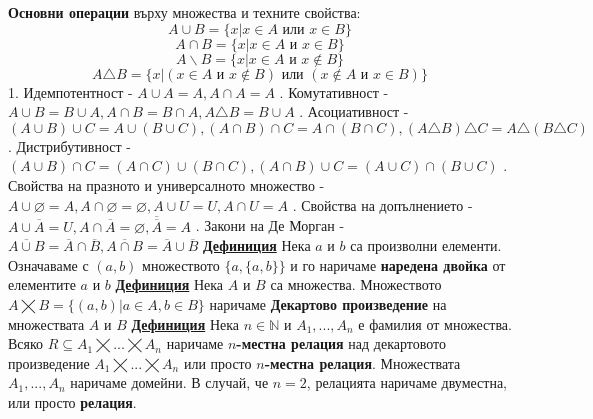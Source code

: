 \documentclass{article}
\begin{document}
\textbf{Основни операции} върху множества и техните свойства:
$$A \cup B = \{x | x \in A \text{ или } x \in B\}$$
$$A \cap B = \{x | x \in A \text{ и } x \in B\}$$
$$A \backslash B = \{x | x \in A \text{ и } x \notin B\}$$
$$A \triangle B = \{x | (x \in A \text{ и } x \notin B) \text{ или } (x \notin A \text{ и } x \in B)\}$$
1. Идемпотентност - $A \cup A = A, A \cap A = A$ . Комутативност - $A \cup B = B \cup A, A \cap B = B \cap A, A \triangle B = B \cup A$ . Асоциативност - $(A \cup B) \cup C = A \cup (B \cup C), (A \cap B) \cap C = A \cap (B \cap C),
(A \triangle B) \triangle C = A \triangle (B \triangle C)$ . Дистрибутивност - $(A \cup B) \cap C = (A \cap C) \cup (B \cap C), (A \cap B) \cup C = (A \cup C) \cap
(B \cup C)$ . Свойства на празното и универсалното множество - $A \cup \varnothing = A, A \cap \varnothing = \varnothing,
A \cup U = U, A \cap U = A$ . Свойства на допълнението - $A \cup \overline{A} = U, A \cap \overline{A} = \varnothing, \overline{\overline{A}} = A$ . Закони на Де Морган - $\overline{A \cup B} = \overline{A} \cap \overline{B}, \overline{A \cap B} = \overline{A}
\cup \overline{B}$ \newline\newline
\textbf{\underline{Дефиниция}} Нека $a$ и $b$ са произволни елементи. Означаваме с $(a, b)$ множеството
$\{a, \{a, b\}\}$ и го наричаме \textbf{наредена двойка} от елементите $a$ и $b$ \newline\newline
\textbf{\underline{Дефиниция}} Нека $A$ и $B$ са множества. Множеството 
$A \bigtimes B = \{(a, b) | a \in A, b \in B\}$ наричаме \textbf{Декартово произведение} на множествата $A$ и $B$ \newline\newline
\textbf{\underline{Дефиниция}}
Нека $n \in \mathbb{N}$ и $A_1,...,A_n$ е фамилия от множества. Всяко $R \subseteq A_1 \bigtimes ... \bigtimes A_n$ наричаме
\textbf{$n$-местна релация} над декартовото произведение $A_1 \bigtimes ... \bigtimes A_n$ или просто \textbf{$n$-местна релация}.
Множествата $A_1, ..., A_n$ наричаме домейни. В случай, че $n = 2$, релацията наричаме двуместна, или просто \textbf{релация}. \newline\newline
\end{document}
